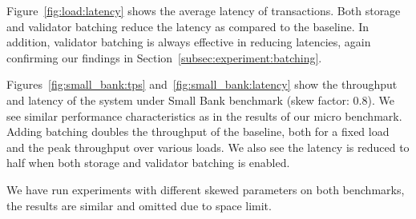 Figure~\ref{fig:load:latency} shows the average latency of transactions. Both storage and validator batching reduce the latency as compared to the baseline. In addition, validator batching is always effective in reducing latencies, again confirming our findings in Section~\ref{subsec:experiment:batching}.

Figures~\ref{fig:small_bank:tps} and~\ref{fig:small_bank:latency} show the throughput and latency of the system under Small Bank benchmark (skew factor: 0.8). We see similar performance characteristics as in the results of our micro benchmark. Adding batching doubles the throughput of the baseline, both for a fixed load and the peak throughput over various loads. We also see the latency is reduced to half when both storage and validator batching is enabled.

We have run experiments with different skewed parameters on both benchmarks, the results are similar and omitted due to space limit.
